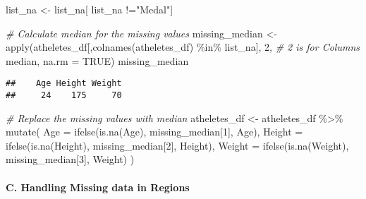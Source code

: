 \documentclass[
]{article}
\newenvironment{Shaded}{\begin{snugshade}}{\end{snugshade}}
\newcommand{\AttributeTok}[1]{\textcolor[rgb]{0.77,0.63,0.00}{#1}}
\newcommand{\CommentTok}[1]{\textcolor[rgb]{0.56,0.35,0.01}{\textit{#1}}}
\newcommand{\ConstantTok}[1]{\textcolor[rgb]{0.00,0.00,0.00}{#1}}
\newcommand{\DecValTok}[1]{\textcolor[rgb]{0.00,0.00,0.81}{#1}}
\newcommand{\FunctionTok}[1]{\textcolor[rgb]{0.00,0.00,0.00}{#1}}
\newcommand{\NormalTok}[1]{#1}
\newcommand{\OtherTok}[1]{\textcolor[rgb]{0.56,0.35,0.01}{#1}}
\newcommand{\SpecialCharTok}[1]{\textcolor[rgb]{0.00,0.00,0.00}{#1}}
\newcommand{\StringTok}[1]{\textcolor[rgb]{0.31,0.60,0.02}{#1}}
\begin{document}
\begin{Shaded}
\begin{Highlighting}[]
\NormalTok{list\_na }\OtherTok{\textless{}{-}}\NormalTok{ list\_na[ list\_na }\SpecialCharTok{!=}\StringTok{"Medal"}\NormalTok{]}

\CommentTok{\# Calculate median for the missing values}
\NormalTok{missing\_median }\OtherTok{\textless{}{-}} \FunctionTok{apply}\NormalTok{(atheletes\_df[,}\FunctionTok{colnames}\NormalTok{(atheletes\_df) }\SpecialCharTok{\%in\%}\NormalTok{ list\_na],}
      \DecValTok{2}\NormalTok{, }\CommentTok{\# 2 is for Columns}
\NormalTok{      median,}
      \AttributeTok{na.rm =}  \ConstantTok{TRUE}\NormalTok{)}
\NormalTok{missing\_median}
\end{Highlighting}
\end{Shaded}

\begin{verbatim}
##    Age Height Weight 
##     24    175     70
\end{verbatim}

\begin{Shaded}
\begin{Highlighting}[]
\CommentTok{\# Replace the missing values with median}
\NormalTok{atheletes\_df }\OtherTok{\textless{}{-}}\NormalTok{ atheletes\_df }\SpecialCharTok{\%\textgreater{}\%}
   \FunctionTok{mutate}\NormalTok{(}
     \AttributeTok{Age  =} \FunctionTok{ifelse}\NormalTok{(}\FunctionTok{is.na}\NormalTok{(Age), missing\_median[}\DecValTok{1}\NormalTok{], Age),}
     \AttributeTok{Height =} \FunctionTok{ifelse}\NormalTok{(}\FunctionTok{is.na}\NormalTok{(Height), missing\_median[}\DecValTok{2}\NormalTok{], Height),}
     \AttributeTok{Weight =} \FunctionTok{ifelse}\NormalTok{(}\FunctionTok{is.na}\NormalTok{(Weight), missing\_median[}\DecValTok{3}\NormalTok{], Weight)}
\NormalTok{   )}
\end{Highlighting}
\end{Shaded}

\hypertarget{c.-handling-missing-data-in-regions}{%
\paragraph{C. Handling Missing data in
Regions}\label{c.-handling-missing-data-in-regions}}

\begin{Shaded}
\end{Shaded}
\end{document}
